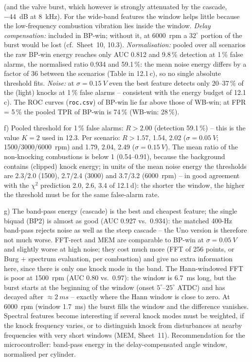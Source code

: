 \begin{solution}
(and the valve burst, which however is strongly attenuated by the cascade, \SI{-44}{dB}
at \SI{8}{kHz}). For the wide-band features the window helps little because the
low-frequency combustion vibration lies inside the window.
\emph{Delay compensation:} included in BP-win; without it, at \SI{6000}{rpm} a
$32^\circ$ portion of the burst would be lost (cf.\ Sheet~10, 10.3).
\emph{Normalisation:} pooled over all scenarios the raw BP-win energy reaches only
AUC 0.812 and 9.8\,\% detection at 1\,\% false alarms, the normalised ratio 0.934 and
59.1\,\%: the mean noise energy differs by a factor of 36 between the scenarios
(Table in 12.1\,c), so no single absolute threshold fits.
\emph{Noise:} at $\sigma=\SI{0.15}{V}$ even the best feature detects only 20--37\,\% of
the (light) knocks at 1\,\% false alarms -- consistent with the energy budget of 12.1\,c).
The ROC curves (\texttt{roc.csv}) of BP-win lie far above those of WB-win; at FPR = 5\,\%
the pooled TPR of BP-win is 74\,\% (WB-win: 28\,\%).

f) Pooled threshold for 1\,\% false alarms: $R>2.00$ (detection 59.1\,\%) -- this is the
value $K=2$ used in 12.3. Per scenario: $R>1.57$, 1.54, 2.02 ($\sigma=\SI{0.05}{V}$;
1500/3000/\SI{6000}{rpm}) and 1.79, 2.04, 2.49 ($\sigma=\SI{0.15}{V}$). The mean ratio of the
non-knocking combustions is below 1 (0.54--0.91), because the background contains
(clipped) knock energy; in units of the mean noise energy the thresholds are 2.3/2.0
(1500), 2.7/2.4 (3000) and 3.7/3.2 (\SI{6000}{rpm}) -- in good agreement with the
$\chi^2$ prediction 2.0, 2.6, 3.4 of 12.1\,d): the shorter the window, the higher the
threshold must be for the same false-alarm rate.

g) The band-pass energy (cascade) is the best and cheapest feature; the single biquad
(BP2) is almost as good (AUC 0.927 vs.\ 0.934): the matched 400-Hz band-pass rejects
noise as well as the steep cascade -- the Uno version is therefore not much worse.
FFT-rect and MEM are comparable to BP-win at $\sigma=\SI{0.05}{V}$ and slightly worse at
high noise; they cost much more (FFT of 256 points, or Burg + spectrum evaluation, per
combustion) and give no extra information here, since there is only one knock mode in
the band. The Hann-windowed FFT is poor at \SI{1500}{rpm} (AUC 0.80 vs.\ 0.97): the
window is \SI{6.7}{ms} long, but the burst starts at the beginning of the window
(onset $5^\circ$--$25^\circ$ ATDC) and has decayed after $\approx\SI{2}{ms}$ -- exactly
where the Hann window is close to zero. At \SI{6000}{rpm} (window \SI{1.7}{ms}) the burst
fills the window and the difference vanishes. Spectral features become interesting if
several knock modes must be weighted, if the knock frequency varies, or to distinguish
knock from disturbances at nearby frequencies with very short windows (MEM, Sheet~11).
Recommendation for the microcontroller: band-pass energy in the delay-compensated angle
window, normalised per cylinder.


\end{solution}

